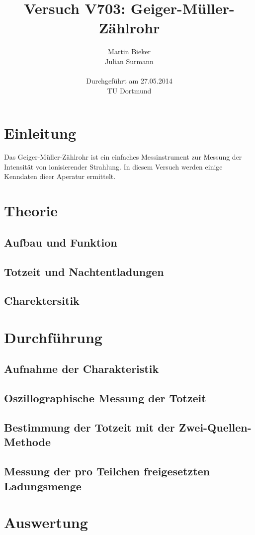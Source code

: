 \documentclass[11pt,ngerman,a4paper]{article}
\title{\textbf{Versuch V703: Geiger-Müller-Zählrohr}}
\author{Martin Bieker\\
		Julian Surmann\\
		\\
		Durchgef\"{u}hrt am 27.05.2014\\
		TU Dortmund}
\date{}
\begin{document}
\renewcommand\tablename{Tabelle}
\renewcommand\figurename{Abbildung}
\maketitle
\thispagestyle{empty}
\newpage
\clearpage
\setcounter{page}{1}


\section{Einleitung}
Das Geiger-Müller-Zählrohr ist ein einfaches Messinstrument zur Messung der Intensität von ionisierender Strahlung. In diesem Versuch werden einige Kenndaten dieer Aperatur ermittelt.
\section{Theorie}
\subsection{Aufbau und Funktion}
\subsection{Totzeit und Nachtentladungen}
\subsection{Charektersitik}
\section{Durchführung}
\subsection{Aufnahme der Charakteristik}
\subsection{Oszillographische Messung der Totzeit}
\subsection{Bestimmung der Totzeit mit der Zwei-Quellen-Methode}
\subsection{Messung der pro Teilchen freigesetzten Ladungsmenge}
\section{Auswertung}
\end{document}
